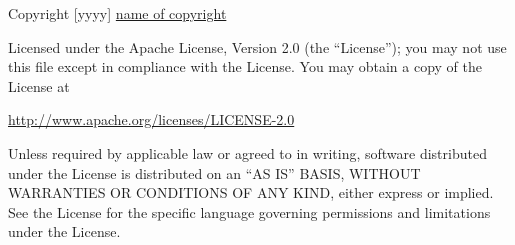 \documentclass[]{article}
\begin{document}
Copyright {[}yyyy{]} \href{owner}{name of copyright}

Licensed under the Apache License, Version 2.0 (the ``License''); you
may not use this file except in compliance with the License. You may
obtain a copy of the License at

\url{http://www.apache.org/licenses/LICENSE-2.0}

Unless required by applicable law or agreed to in writing, software
distributed under the License is distributed on an ``AS IS'' BASIS,
WITHOUT WARRANTIES OR CONDITIONS OF ANY KIND, either express or implied.
See the License for the specific language governing permissions and
limitations under the License.
\end{document}

